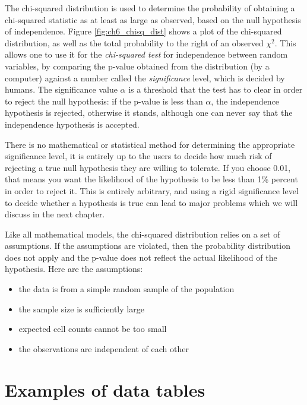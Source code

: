 \documentclass[
  letterpaper,
  DIV=11,
  numbers=noendperiod]{scrreprt}
\providecommand{\tightlist}{%
  \setlength{\itemsep}{0pt}\setlength{\parskip}{0pt}}\usepackage{longtable,booktabs,array}
\begin{document}
The chi-squared distribution is used to determine the probability of
obtaining a chi-squared statistic as at least as large as observed,
based on the null hypothesis of independence. Figure
\ref{fig:ch6_chisq_dist} shows a plot of the chi-squared distribution,
as well as the total probability to the right of an observed \(\chi^2\).
This allows one to use it for the \emph{chi-squared test} for
independence between random variables, by comparing the p-value obtained
from the distribution (by a computer) against a number called the
\emph{significance} level, which is decided by humans. The significance
value \(\alpha\) is a threshold that the test has to clear in order to
reject the null hypothesis: if the p-value is less than \(\alpha\), the
independence hypothesis is rejected, otherwise it stands, although one
can never say that the independence hypothesis is accepted.

There is no mathematical or statistical method for determining the
appropriate significance level, it is entirely up to the users to decide
how much risk of rejecting a true null hypothesis they are willing to
tolerate. If you choose 0.01, that means you want the likelihood of the
hypothesis to be less than 1\% percent in order to reject it. This is
entirely arbitrary, and using a rigid significance level to decide
whether a hypothesis is true can lead to major problems which we will
discuss in the next chapter.

Like all mathematical models, the chi-squared distribution relies on a
set of assumptions. If the assumptions are violated, then the
probability distribution does not apply and the p-value does not reflect
the actual likelihood of the hypothesis. Here are the assumptions:

\begin{itemize}
\tightlist
\item
  the data is from a simple random sample of the population
\item
  the sample size is sufficiently large
\item
  expected cell counts cannot be too small
\item
  the observations are independent of each other
\end{itemize}

\hypertarget{examples-of-data-tables}{%
\section{Examples of data tables}\label{examples-of-data-tables}}
\end{document}
